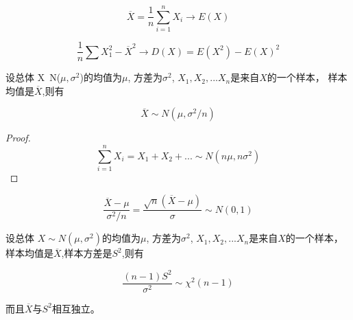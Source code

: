 \begin{corollary}[矩估计法原理]
    \begin{equation}\overline{X}=\frac{1}{n} \sum_{i=1}^{n} X_{i} \to E(X)\end{equation}

    \begin{equation}\frac{1}{n} \sum X_1^2 - \overline{X}^2 \to D(X) = E(X^2) - E(X)^2\end{equation}
\end{corollary}

\begin{theorem}[样本均值的分布]
    设总体 X~N($\mu,\sigma^2$)的均值为$\mu$, 方差为$σ^2$, $X_1,X_2,...X_n$是来自$X$的一个样本， 样本均值是$\overline{X}$,则有

    \begin{equation}
        {\overline{X} \sim N(\mu,\sigma^2/n) }
    \end{equation}
\end{theorem}

\begin{proof}
    \begin{equation}
        \sum^n_{i=1} X_i = X_1 + X_2 + ...\sim N(n\mu, n\sigma^2)
    \end{equation}
\end{proof}

\begin{corollary}
    \begin{equation}
        \frac{\overline{X}-\mu}{\sigma^2/n} = \frac{\sqrt{n}(\overline{X}-\mu)}{\sigma} \sim N(0,1)
    \end{equation}
\end{corollary}

\begin{theorem}[样本方差的分布]
    设总体 $X\sim N(\mu,\sigma^2)$的均值为$\mu$, 方差为$σ^2$, $X_1,X_2,...X_n$是来自$X$的一个样本， 样本均值是$\overline{X}$,样本方差是$S^2$,则有

    \begin{equation}
        { \frac{(n-1)S^2}{\sigma^2} \sim \chi^2(n-1)}
    \end{equation}

    而且$\overline{X}$与$S^2$相互独立。
\end{theorem}

